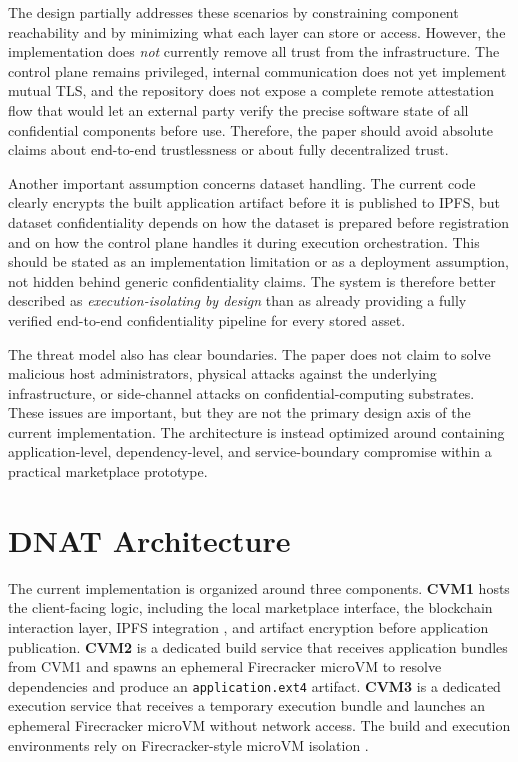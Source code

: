 \documentclass[sigconf,nonacm]{acmart}
\begin{document}
The design partially addresses these scenarios by constraining component reachability and by minimizing what each layer can store or access. However, the implementation does \emph{not} currently remove all trust from the infrastructure. The control plane remains privileged, internal communication does not yet implement mutual TLS, and the repository does not expose a complete remote attestation flow that would let an external party verify the precise software state of all confidential components before use. Therefore, the paper should avoid absolute claims about end-to-end trustlessness or about fully decentralized trust.

Another important assumption concerns dataset handling. The current code clearly encrypts the built application artifact before it is published to IPFS, but dataset confidentiality depends on how the dataset is prepared before registration and on how the control plane handles it during execution orchestration. This should be stated as an implementation limitation or as a deployment assumption, not hidden behind generic confidentiality claims. The system is therefore better described as \emph{execution-isolating by design} than as already providing a fully verified end-to-end confidentiality pipeline for every stored asset.

The threat model also has clear boundaries. The paper does not claim to solve malicious host administrators, physical attacks against the underlying infrastructure, or side-channel attacks on confidential-computing substrates. These issues are important, but they are not the primary design axis of the current implementation. The architecture is instead optimized around containing application-level, dependency-level, and service-boundary compromise within a practical marketplace prototype.

\section{DNAT Architecture}

The current implementation is organized around three components. \textbf{CVM1} hosts the client-facing logic, including the local marketplace interface, the blockchain interaction layer, IPFS integration \cite{benet2014ipfs}, and artifact encryption before application publication. \textbf{CVM2} is a dedicated build service that receives application bundles from CVM1 and spawns an ephemeral Firecracker microVM to resolve dependencies and produce an \texttt{application.ext4} artifact. \textbf{CVM3} is a dedicated execution service that receives a temporary execution bundle and launches an ephemeral Firecracker microVM without network access. The build and execution environments rely on Firecracker-style microVM isolation \cite{agache2020firecracker}.
\end{document}

